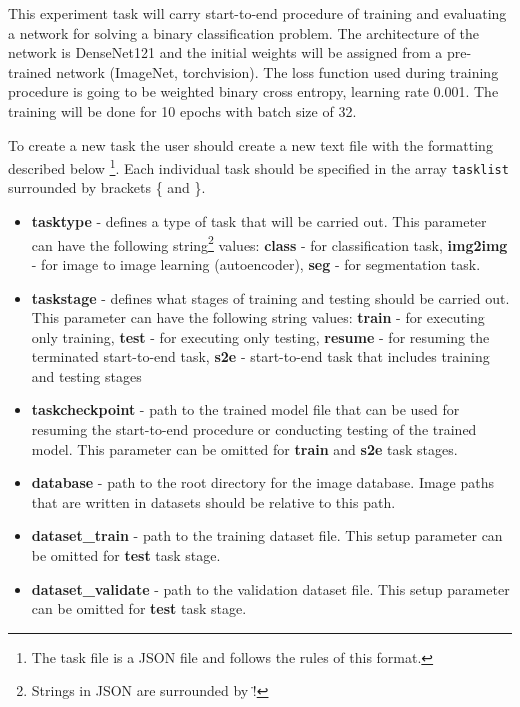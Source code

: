 \documentclass[a4paper, 11pt]{article}
\begin{document}
This experiment task will carry start-to-end procedure of training and evaluating a network for solving a binary classification problem. The architecture of the network is DenseNet121 and the initial weights will be assigned from a pre-trained network (ImageNet, torchvision). The loss function used during training procedure is going to be weighted binary cross entropy, learning rate 0.001. The training will be done for 10 epochs with batch size of 32.

To create a new task the user should create a new text file with the formatting described below \footnote{The task file is a JSON file and follows the rules of this format.}.
Each individual task should be specified in the array \texttt{tasklist} surrounded by brackets \{ and \}.

\begin{itemize}
    \item \textbf{tasktype} - defines a type of task that will be carried out. This parameter can have the following string\footnote{Strings in JSON are surrounded by \"!} values: \textbf{class} - for classification task, 
    \textbf{img2img} - for image to image learning (autoencoder), \textbf{seg} - for segmentation task.
    
    \item \textbf{taskstage} - defines what stages of training and testing should be carried out. This parameter can have the following string values: \textbf{train} - for executing only training, \textbf{test} - for executing only testing, \textbf{resume} - for resuming the terminated start-to-end task, \textbf{s2e} - start-to-end task that includes training and testing stages
    
    \item \textbf{taskcheckpoint} - path to the trained model file that can be used for resuming the start-to-end procedure or conducting testing of the trained model. This parameter can be omitted for \textbf{train} and \textbf{s2e} task stages.
    
    \item \textbf{database} - path to the root directory for the image database. Image paths that are written in datasets should be relative to this path.
    
    \item \textbf{dataset\_train} - path to the training dataset file. This setup parameter can be omitted for \textbf{test} task stage.
    
    \item \textbf{dataset\_validate} - path to the validation dataset file. This setup parameter can be omitted for \textbf{test} task stage.
    

\end{itemize}
\end{document}
